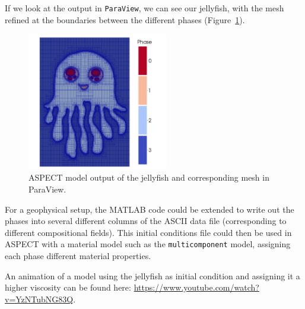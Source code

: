 \documentclass{article}
\newcommand{\aspect}{\textsc{ASPECT}}
\begin{document}
If we look at the output in \texttt{ParaView}, we can see our jellyfish, with the mesh refined at the 
boundaries between the different phases (Figure~\ref{fig:jelly-paraview}). 
\begin{figure}[tb]
    \centering
    \includegraphics[width=0.55\textwidth]{cookbooks/geomio/jelly-paraview.pdf}
    \caption{\aspect{} model output of the jellyfish and corresponding mesh in ParaView.}
    \label{fig:jelly-paraview}
\end{figure}

For a geophysical setup, the MATLAB code could be extended to write out the phases into several different columns 
of the ASCII data file (corresponding to different compositional fields). This initial conditions file could then be 
used in \aspect{} with a material model such as the \texttt{multicomponent} model, assigning each phase different 
material properties. 

An animation of a model using the jellyfish as initial condition and assigning it a higher viscosity can be found here: \url{https://www.youtube.com/watch?v=YzNTubNG83Q}. 
\end{document}
